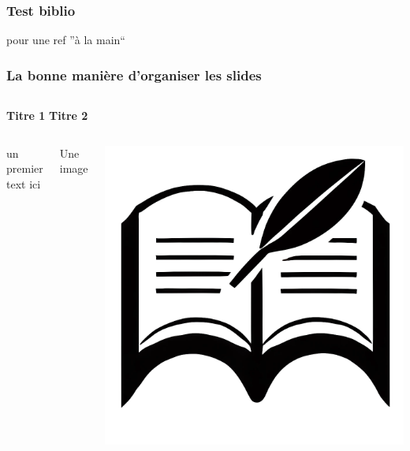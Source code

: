 \documentclass[12pt,xcolor=dvipsnames,aspectratio=1610]{beamer}
\begin{document}
\begin{frame}\frametitle{Test biblio}

  pour une ref ''à la main``

  \vfillb %

  

\end{frame}

\begin{frame}\frametitle{La bonne manière d'organiser les slides}
  
  \begin{columns}
    \textbf{Titre 1}
    \textbf{Titre 2}
  \end{columns}
  
  \begin{columns}
    un premier text ici
    
    Une image
    \begin{center}
      \includegraphics[width=.5\textwidth,keepaspectratio]{logos/bib.png}
    \end{center}
  \end{columns}
\end{frame}
\end{document}
